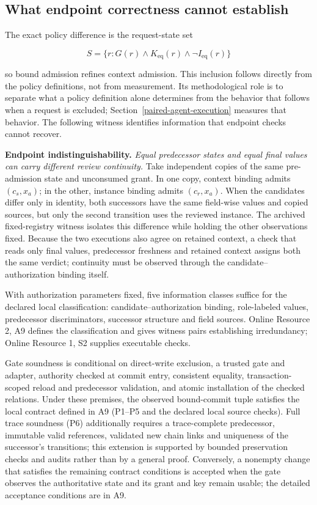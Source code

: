 \documentclass[pdflatex,sn-basic]{sn-jnl}
\begin{document}
\subsection{What endpoint correctness cannot establish}\label{what-endpoint-correctness-cannot-establish}

The exact policy difference is the request-state set

\[
S = \{r : G(r) \land  K_{\mathrm{eq}}(r) \land  \neg I_{\mathrm{eq}}(r)\}
\]

so bound admission refines context admission. This inclusion follows directly from the policy definitions, not from measurement. Its methodological role is to separate what a policy definition alone determines from the behavior that follows when a request is excluded; Section~\ref{paired-agent-execution} measures that behavior. The following witness identifies information that endpoint checks cannot recover.

\textbf{Endpoint indistinguishability.} \emph{Equal predecessor states and equal final values can carry different review continuity.} Take independent copies of the same pre-admission state and unconsumed grant. In one copy, context binding admits \((c_s,x_a)\); in the other, instance binding admits \((c_r,x_a)\). When the candidates differ only in identity, both successors have the same field-wise values and copied sources, but only the second transition uses the reviewed instance. The archived fixed-registry witness isolates this difference while holding the other observations fixed. Because the two executions also agree on retained context, a check that reads only final values, predecessor freshness and retained context assigns both the same verdict; continuity must be observed through the candidate--authorization binding itself.

With authorization parameters fixed, five information classes suffice for the declared local classification: candidate--authorization binding, role-labeled values, predecessor discriminators, successor structure and field sources. Online Resource 2, A9 defines the classification and gives witness pairs establishing irredundancy; Online Resource 1, S2 supplies executable checks.

Gate soundness is conditional on direct-write exclusion, a trusted gate and adapter, authority checked at commit entry, consistent equality, transaction-scoped reload and predecessor validation, and atomic installation of the checked relations. Under these premises, the observed bound-commit tuple satisfies the local contract defined in A9 (P1--P5 and the declared local source checks). Full trace soundness (P6) additionally requires a trace-complete predecessor, immutable valid references, validated new chain links and uniqueness of the successor's transitions; this extension is supported by bounded preservation checks and audits rather than by a general proof. Conversely, a nonempty change that satisfies the remaining contract conditions is accepted when the gate observes the authoritative state and its grant and key remain usable; the detailed acceptance conditions are in A9.
\end{document}
